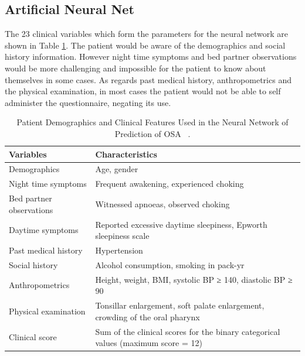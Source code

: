 \subsection{Artificial Neural Net}
The 23 clinical variables which form the parameters for the neural network are shown in Table \ref{table:neural}. The patient would be aware of the demographics and social history information. However night time symptoms and bed partner observations would be more challenging and impossible for the patient to know about themselves in some cases. As regards past medical history, anthropometrics and the physical examination, in most cases the patient would not be able to self administer the questionnaire, negating its use.
\begin{table}[h]
\centering
\begin{tabular}{p{5cm} p{10cm}}
\toprule
Variables&Characteristics\\ \midrule
Demographics&Age, gender\\ 
Night time symptoms&Frequent awakening, experienced choking\\ 
Bed partner observations&Witnessed apnoeas, observed choking\\ 
Daytime symptoms&Reported excessive daytime sleepiness, Epworth sleepiness scale\\ 
Past medical history&Hypertension\\ 
Social history&Alcohol consumption, smoking in pack-yr\\ 
Anthropometrics&Height, weight, BMI, systolic BP ≥ 140, diastolic BP ≥ 90\\ 
Physical examination&Tonsillar enlargement, soft palate enlargement, crowding of the oral pharynx\\ 
Clinical score&Sum of the clinical scores for the binary categorical values (maximum score = 12)\\ \bottomrule
\end{tabular}
\caption{Patient Demographics and Clinical Features Used in the Neural Network of Prediction of OSA ~\cite{kirby1999neural}.}
\label{table:neural}
\end{table} 

